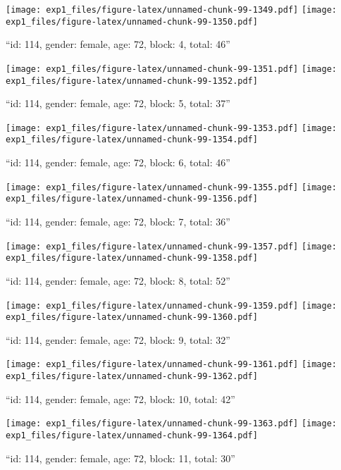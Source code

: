 \documentclass[,]{article}
\begin{document}
\texttt{[image: exp1\_files/figure-latex/unnamed-chunk-99-1349.pdf]}
\texttt{[image: exp1\_files/figure-latex/unnamed-chunk-99-1350.pdf]}

\newpage
[1] 

``id: 114, gender: female, age: 72, block: 4, total: 46''

\texttt{[image: exp1\_files/figure-latex/unnamed-chunk-99-1351.pdf]}
\texttt{[image: exp1\_files/figure-latex/unnamed-chunk-99-1352.pdf]}

\newpage
[1] 

``id: 114, gender: female, age: 72, block: 5, total: 37''

\texttt{[image: exp1\_files/figure-latex/unnamed-chunk-99-1353.pdf]}
\texttt{[image: exp1\_files/figure-latex/unnamed-chunk-99-1354.pdf]}

\newpage
[1] 

``id: 114, gender: female, age: 72, block: 6, total: 46''

\texttt{[image: exp1\_files/figure-latex/unnamed-chunk-99-1355.pdf]}
\texttt{[image: exp1\_files/figure-latex/unnamed-chunk-99-1356.pdf]}

\newpage
[1] 

``id: 114, gender: female, age: 72, block: 7, total: 36''

\texttt{[image: exp1\_files/figure-latex/unnamed-chunk-99-1357.pdf]}
\texttt{[image: exp1\_files/figure-latex/unnamed-chunk-99-1358.pdf]}

\newpage
[1] 

``id: 114, gender: female, age: 72, block: 8, total: 52''

\texttt{[image: exp1\_files/figure-latex/unnamed-chunk-99-1359.pdf]}
\texttt{[image: exp1\_files/figure-latex/unnamed-chunk-99-1360.pdf]}

\newpage
[1] 

``id: 114, gender: female, age: 72, block: 9, total: 32''

\texttt{[image: exp1\_files/figure-latex/unnamed-chunk-99-1361.pdf]}
\texttt{[image: exp1\_files/figure-latex/unnamed-chunk-99-1362.pdf]}

\newpage
[1] 

``id: 114, gender: female, age: 72, block: 10, total: 42''

\texttt{[image: exp1\_files/figure-latex/unnamed-chunk-99-1363.pdf]}
\texttt{[image: exp1\_files/figure-latex/unnamed-chunk-99-1364.pdf]}

\newpage
[1] 

``id: 114, gender: female, age: 72, block: 11, total: 30''
\end{document}

